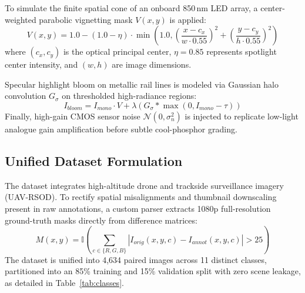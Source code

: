 \documentclass[conference]{IEEEtran}
\begin{document}
To simulate the finite spatial cone of an onboard 850\,nm LED array, a center-weighted parabolic vignetting mask $V(x,y)$ is applied:
\begin{equation}
V(x, y) = 1.0 - (1.0 - \eta) \cdot \min\left(1.0, \left(\frac{x - c_x}{w \cdot 0.55}\right)^2 + \left(\frac{y - c_y}{h \cdot 0.55}\right)^2\right)
\end{equation}
where $(c_x, c_y)$ is the optical principal center, $\eta = 0.85$ represents spotlight center intensity, and $(w, h)$ are image dimensions. 

Specular highlight bloom on metallic rail lines is modeled via Gaussian halo convolution $G_\sigma$ on thresholded high-radiance regions:
\begin{equation}
I_{bloom} = I_{mono} \cdot V + \lambda \left( G_\sigma * \max(0, I_{mono} - \tau) \right)
\end{equation}
Finally, high-gain CMOS sensor noise $\mathcal{N}(0, \sigma_n^2)$ is injected to replicate low-light analogue gain amplification before subtle cool-phosphor grading.

\subsection{Unified Dataset Formulation}
The dataset integrates high-altitude drone and trackside surveillance imagery (UAV-RSOD). To rectify spatial misalignments and thumbnail downscaling present in raw annotations, a custom parser extracts 1080p full-resolution ground-truth masks directly from difference matrices:
\begin{equation}
M(x, y) = \mathbb{I}\left( \sum_{c \in \{R,G,B\}} |I_{orig}(x,y,c) - I_{annot}(x,y,c)| > 25 \right)
\end{equation}
The dataset is unified into 4,634 paired images across 11 distinct classes, partitioned into an 85\% training and 15\% validation split with zero scene leakage, as detailed in Table~\ref{tab:classes}.
\end{document}
